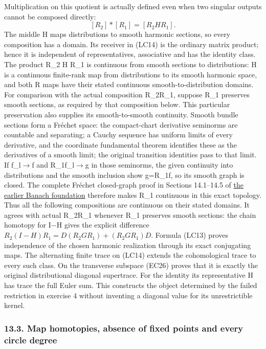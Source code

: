 \documentclass[
  11pt,
]{article}
\begin{document}
Multiplication on this quotient is actually defined even when two
singular outputs cannot be composed directly: \[
[R_2]*[R_1]=[R_2 H R_1].
\tag{LC15}
\] The middle H maps distributions to smooth harmonic sections, so every
composition has a domain. Its receiver in (LC14) is the ordinary matrix
product; hence it is independent of representatives, associative and has
the identity class. The product R\_2 H R\_1 is continuous from smooth
sections to distributions: H is a continuous finite-rank map from
distributions to its smooth harmonic space, and both R maps have their
stated continuous smooth-to-distribution domains. For comparison with
the actual composition R\_2R\_1, suppose R\_1 preserves smooth sections,
as required by that composition below. This particular preservation also
supplies its smooth-to-smooth continuity. Smooth bundle sections form a
Fréchet space: the compact-chart derivative seminorms are countable and
separating; a Cauchy sequence has uniform limits of every derivative,
and the coordinate fundamental theorem identifies these as the
derivatives of a smooth limit; the original transition identities pass
to that limit. If f\_l\ensuremath{\to}f and R\_1f\_l\ensuremath{\to}g in those seminorms, the given
continuity into distributions and the smooth inclusion show g=R\_1f, so
its smooth graph is closed. The complete Fréchet closed-graph proof in
Sections 14.1--14.5 of
\href{banach-foundation-bridges.pdf\#section*.54}{the
earlier Banach foundation} therefore makes R\_1 continuous in this exact
topology. Thus all the following compositions are continuous on their
stated domains. It agrees with actual R\_2R\_1 whenever R\_1 preserves
smooth sections: the chain homotopy for I−H gives the explicit
difference \(R_2(I-H)R_1=D(R_2GR_1)+(R_2GR_1)D\). Formula (LC13) proves
independence of the chosen harmonic realization through its exact
conjugating maps. The alternating finite trace on (LC14) extends the
cohomological trace to every such class. On the transverse subspace
(EC26) proves that it is exactly the original distributional diagonal
supertrace. For the identity its representative H has trace the full
Euler sum. This constructs the object determined by the failed
restriction in exercise 4 without inventing a diagonal value for its
unrestrictible kernel.

\subsubsection{13.3. Map homotopies, absence of fixed points and every
circle
degree}\label{map-homotopies-absence-of-fixed-points-and-every-circle-degree}
\end{document}
